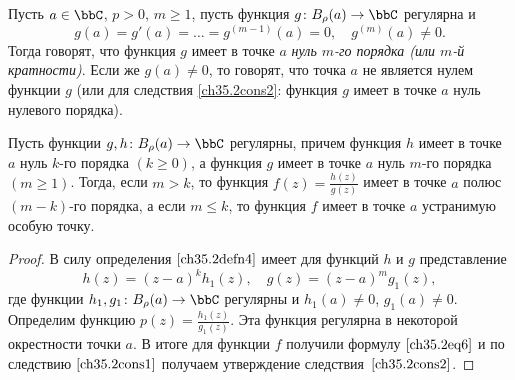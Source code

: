 \begin{defn} \label{ch35.2defn4}
Пусть $a \in \bbC$, $p > 0$, $m \ge 1$, пусть функция $g\colon B_{\rho}(a) \to \bbC$ регулярна и
$$
g(a) = g'(a) = \ldots = g^{(m - 1)}(a) = 0, \quad g^{(m)}(a) \not= 0.
$$
Тогда говорят, что функция $g$ имеет в точке $a$ \textit{нуль $m$-го порядка (или $m$-й кратности)}. Если же $g(a) \not= 0$, то говорят, что точка $a$ не является нулем функции $g$ (или для следствия \ref{ch35.2cons2}: функция $g$ имеет в точке $a$ нуль нулевого порядка).
\end{defn}

\begin{cons} \label{ch35.2cons2}
Пусть функции $g,h\colon B_\rho(a) \to \bbC$ регулярны, причем функция $h$ имеет в точке $a$ нуль $k$-го порядка $(k \ge 0)$, а функция $g$ имеет в точке $a$ нуль $m$-го порядка $(m \ge 1)$. Тогда, если
$m > k$, то функция $f(z) = \frac{h(z)}{g(z)}$ имеет в точке $a$ полюс $(m - k)$-го порядка, а если $m \le k$, то функция $f$ имеет в точке $a$ устранимую особую точку.
\end{cons}

\begin{proof}
В силу определения $\eqref{ch35.2defn4}$ имеет для функций $h$ и $g$ представление
$$
h(z) = (z - a)^k h_1(z), \quad g(z) = (z - a)^m g_1(z),
$$
где функции $h_1,g_1\colon B_\rho(a) \to \bbC$ регулярны и $h_1(a) \not= 0$, $g_1(a) \not= 0$.
Определим функцию $p(z) = \frac{h_1(z)}{g_1(z)}$. Эта функция регулярна в некоторой окрестности точки $a$. В итоге для функции $f$ получили формулу $\eqref{ch35.2eq6}$ и по следствию $\eqref{ch35.2cons1}$ получаем утверждение следствия~$\eqref{ch35.2cons2}$.
\end{proof}

